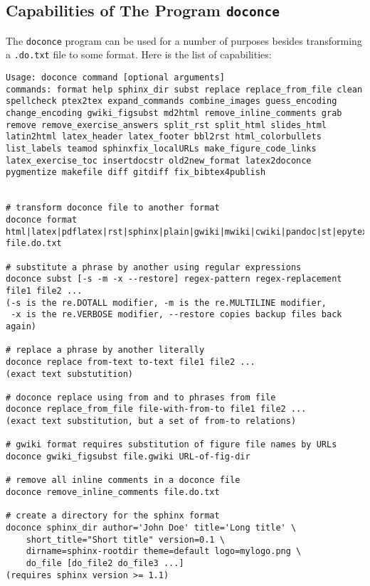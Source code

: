 \documentclass[%
oneside,                 %
final,                   %
10pt]{article}
\begin{document}
\subsection{Capabilities of The Program \protect\Verb!doconce! }

The \Verb!doconce! program can be used for a number of purposes besides
transforming a \Verb!.do.txt! file to some format. Here is the
list of capabilities:

\begin{Verbatim}[numbers=none,fontsize=\fontsize{9pt}{9pt},baselinestretch=0.85,xleftmargin=0mm]
Usage: doconce command [optional arguments]
commands: format help sphinx_dir subst replace replace_from_file clean spellcheck ptex2tex expand_commands combine_images guess_encoding change_encoding gwiki_figsubst md2html remove_inline_comments grab remove remove_exercise_answers split_rst split_html slides_html latin2html latex_header latex_footer bbl2rst html_colorbullets list_labels teamod sphinxfix_localURLs make_figure_code_links latex_exercise_toc insertdocstr old2new_format latex2doconce pygmentize makefile diff gitdiff fix_bibtex4publish


# transform doconce file to another format
doconce format html|latex|pdflatex|rst|sphinx|plain|gwiki|mwiki|cwiki|pandoc|st|epytext file.do.txt

# substitute a phrase by another using regular expressions
doconce subst [-s -m -x --restore] regex-pattern regex-replacement file1 file2 ...
(-s is the re.DOTALL modifier, -m is the re.MULTILINE modifier,
 -x is the re.VERBOSE modifier, --restore copies backup files back again)

# replace a phrase by another literally
doconce replace from-text to-text file1 file2 ...
(exact text substutition)

# doconce replace using from and to phrases from file
doconce replace_from_file file-with-from-to file1 file2 ...
(exact text substitution, but a set of from-to relations)

# gwiki format requires substitution of figure file names by URLs
doconce gwiki_figsubst file.gwiki URL-of-fig-dir

# remove all inline comments in a doconce file
doconce remove_inline_comments file.do.txt

# create a directory for the sphinx format
doconce sphinx_dir author='John Doe' title='Long title' \
    short_title="Short title" version=0.1 \
    dirname=sphinx-rootdir theme=default logo=mylogo.png \
    do_file [do_file2 do_file3 ...]
(requires sphinx version >= 1.1)


\end{Verbatim}
\end{document}
